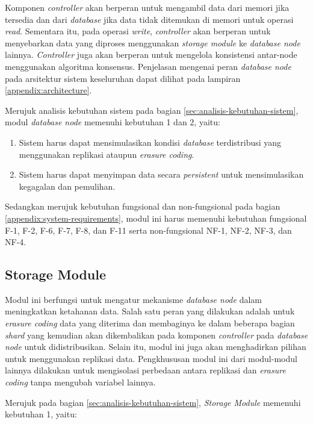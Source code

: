Komponen \textit{controller} akan berperan untuk mengambil data dari memori jika tersedia dan dari \textit{database} jika data tidak ditemukan di memori untuk operasi \textit{read}. Sementara itu, pada operasi \textit{write}, \textit{controller} akan berperan untuk menyebarkan data yang diproses menggunakan \textit{storage module} ke \textit{database node} lainnya. \textit{Controller} juga akan berperan untuk mengelola konsistensi antar-node menggunakan algoritma konsensus. Penjelasan mengenai peran \textit{database node} pada arsitektur sistem keseluruhan dapat dilihat pada lampiran \ref{appendix:architecture}.

Merujuk analisis kebutuhan sistem pada bagian \ref{sec:analisis-kebutuhan-sistem}, modul \textit{database node} memenuhi kebutuhan 1 dan 2, yaitu:

\begin{enumerate}
    \item Sistem harus dapat mensimulasikan kondisi \textit{database} terdistribusi yang menggunakan replikasi ataupun \textit{erasure coding}.
    \item Sistem harus dapat menyimpan data secara \textit{persistent} untuk mensimulasikan kegagalan dan pemulihan.
\end{enumerate}

Sedangkan merujuk kebutuhan fungsional dan non-fungsional pada bagian \ref{appendix:system-requirements}, modul ini harus memenuhi kebutuhan fungsional F-1, F-2, F-6, F-7, F-8, dan F-11 serta non-fungsional NF-1, NF-2, NF-3, dan NF-4.

\subsection{Storage Module}

Modul ini berfungsi untuk mengatur mekanisme \textit{database node} dalam meningkatkan ketahanan data. Salah satu peran yang dilakukan adalah  untuk \textit{erasure coding} data yang diterima dan membaginya ke dalam beberapa bagian \textit{shard} yang kemudian akan dikembalikan pada komponen \textit{controller} pada \textit{database node} untuk didistribusikan. Selain itu, modul ini juga akan menghadirkan pilihan untuk menggunakan replikasi data. Pengkhususan modul ini dari modul-modul lainnya dilakukan untuk mengisolasi perbedaan antara replikasi dan \textit{erasure coding} tanpa mengubah variabel lainnya.

Merujuk pada bagian \ref{sec:analisis-kebutuhan-sistem}, \textit{Storage Module} memenuhi kebutuhan 1, yaitu:

